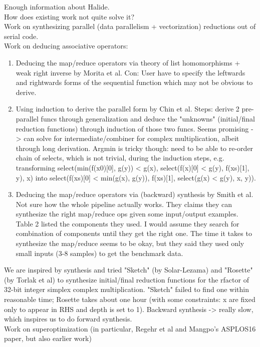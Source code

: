 Enough information about Halide. \\

How does existing work not quite solve it? \\

Work on synthesizing parallel (data parallelism + vectorization) reductions out of serial code. \\

Work on deducing associative operators: \\
\begin{enumerate}
	\item Deducing the map/reduce operators via theory of list homomorphisms + weak right inverse by Morita et al. Con: User have to specify the leftwards and rightwards forms of the sequential function which may not be obvious to derive. 
	\item Using induction to derive the parallel form by Chin et al. Steps: derive 2 pre-parallel funcs through generalization and deduce the "unknowns" (initial/final reduction functions) through induction of those two funcs. Seems promising -> can solve for intermediate/combiner for complex multiplication, albeit through long derivation. Argmin is tricky though: need to be able to re-order chain of selects, which is not trivial, during the induction steps, e.g. transforming select(min(f(x0)[0], g(y)) < g(x), select(f(x)[0] < g(y), f(xs)[1], y), x) into select(f(xs)[0] < min(g(x), g(y)), f(xs)[1], select(g(x) < g(y), x, y)). 	 
	\item Deducing the map/reduce operators via (backward) synthesis by Smith et al. Not sure how the whole pipeline actually works. They claims they can synthesize the right map/reduce ops given some input/output examples. Table 2 listed the components they used. I would assume they search for combination of components until they get the right one. The time it takes to synthesize the map/reduce seems to be okay, but they said they used only small inputs (3-8 samples) to get the benchmark data. \\
\end{enumerate}
	
We are inspired by synthesis and tried "Sketch" (by Solar-Lezama) and "Rosette" (by Torlak et al) to synthesize initial/final reduction functions for the rfactor of 32-bit integer simplex complex multiplication. "Sketch" failed to find one within reasonable time; Rosette takes about one hour (with some constraints: x are fixed only to appear in RHS and depth is set to 1). Backward synthesis -> really slow, which inspires us to do forward synthesis.\\
	
Work on superoptimization (in particular, Regehr et al and Mangpo's ASPLOS16 paper, but also earlier work)


